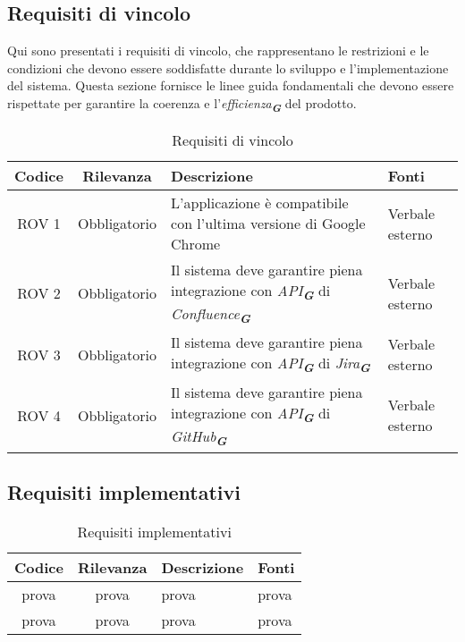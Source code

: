 \subsection{Requisiti di vincolo}
Qui sono presentati i requisiti di vincolo, che rappresentano le restrizioni e le condizioni
che devono essere soddisfatte durante lo sviluppo e l'implementazione del sistema. Questa
sezione fornisce le linee guida fondamentali che devono essere rispettate per garantire la
coerenza e l'\emph{efficienza}\textsubscript{\textit{\textbf{G}}} del prodotto.
\begin{table}[h!]
    \centering
    \renewcommand{\arraystretch}{1.6} %
    \begin{tabularx}{\textwidth}{|>{\centering\arraybackslash}c|>{\centering\arraybackslash}c|>{\centering\arraybackslash}X|>{\centering\arraybackslash}p{3cm}|} \hline
    \rowcolor[HTML]{FFD700} 
    \textbf{Codice} & \textbf{Rilevanza} & \textbf{Descrizione} & \textbf{Fonti} \\ \hline
    ROV 1 & Obbligatorio & L'applicazione è compatibile con l'ultima versione di Google Chrome & Verbale esterno \\ \hline
    ROV 2 & Obbligatorio & Il sistema deve garantire piena integrazione con \emph{API}\textsubscript{\textit{\textbf{G}}} di \emph{Confluence}\textsubscript{\textit{\textbf{G}}} & Verbale esterno \\ \hline
    ROV 3 & Obbligatorio & Il sistema deve garantire piena integrazione con \emph{API}\textsubscript{\textit{\textbf{G}}} di \emph{Jira}\textsubscript{\textit{\textbf{G}}} & Verbale esterno\\ \hline
    ROV 4 & Obbligatorio & Il sistema deve garantire piena integrazione con \emph{API}\textsubscript{\textit{\textbf{G}}} di \emph{GitHub}\textsubscript{\textit{\textbf{G}}} & Verbale esterno \\ \hline
    \end{tabularx}
    \caption{Requisiti di vincolo}
    \label{tab:Requisiti_di_vincolo}
\end{table}

\newpage
\subsection{Requisiti implementativi}
\label{sec:Requisiti_implementativi}
\begin{table}[h!]
    \centering
    \renewcommand{\arraystretch}{1.6} %
    \begin{tabularx}{\textwidth}{|>{\centering\arraybackslash}c|>{\centering\arraybackslash}c|>{\centering\arraybackslash}X|>{\centering\arraybackslash}p{3cm}|} \hline
    \rowcolor[HTML]{FFD700} 
    \textbf{Codice} & \textbf{Rilevanza} & \textbf{Descrizione} & \textbf{Fonti} \\ \hline
    prova & prova & prova & prova \\ \hline
    prova & prova & prova & prova \\ \hline
    \end{tabularx}
    \caption{Requisiti implementativi}
    \label{tab:Requisiti_implementativi}
\end{table}

